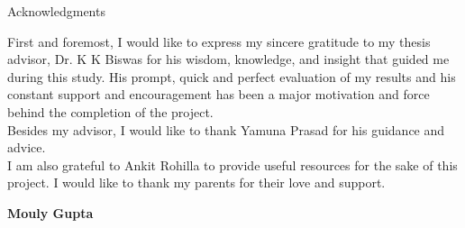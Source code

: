 \begin{center}
\LARGE{Acknowledgments} 
\end{center}

\vspace{0.5in}

First and foremost, I would like to express my sincere gratitude to my thesis advisor, Dr. K K Biswas for his wisdom, knowledge, and insight that guided me during this study. His prompt, quick and perfect evaluation of my results and his constant support and encouragement has been a major motivation and force behind the completion of the project.\\
Besides my advisor, I would like to thank Yamuna Prasad for his guidance and advice.\\
I am also grateful to Ankit Rohilla to provide useful resources for the sake of this project. I would like to thank my parents for their love and support.


\vspace{1.5in}

{\bfseries Mouly Gupta}
